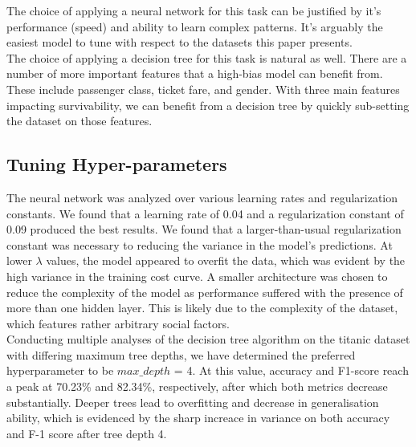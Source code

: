 \documentclass{article}
\begin{document}
The choice of applying a neural network for this task can be justified by it's performance (speed) and ability to learn complex patterns. 
It's arguably the easiest model to tune with respect to the datasets this paper presents.
\\

The choice of applying a decision tree for this task is natural as well. There are a number of more important features that a high-bias model can benefit from. These
include passenger class, ticket fare, and gender. With three main features impacting survivability, we can benefit from a decision tree by quickly sub-setting the dataset on those features.

\subsection*{Tuning Hyper-parameters}

The neural network was analyzed over various learning rates and regularization constants. We found that a learning rate of 0.04 and a regularization constant of 0.09 produced the best results.
We found that a larger-than-usual regularization constant was necessary to reducing the variance in the model's predictions. At lower $\lambda$ values, the model appeared to overfit the data, which was evident by the high variance in the training cost curve.
A smaller architecture was chosen to reduce the complexity of the model as performance suffered with the presence of more than one hidden layer.
This is likely due to the complexity of the dataset, which features rather arbitrary social factors.
\\

Conducting multiple analyses of the decision tree algorithm on the titanic dataset with differing maximum tree depths,
we have determined the preferred hyperparameter to be $max\_depth$ = 4. 
At this value, accuracy and F1-score reach a peak at 70.23\% and 82.34\%, respectively, after which both metrics decrease substantially.
Deeper trees lead to overfitting and decrease in generalisation ability, 
which is evidenced by the sharp increace in variance on both accuracy and F-1 score after tree depth 4.
\end{document}
